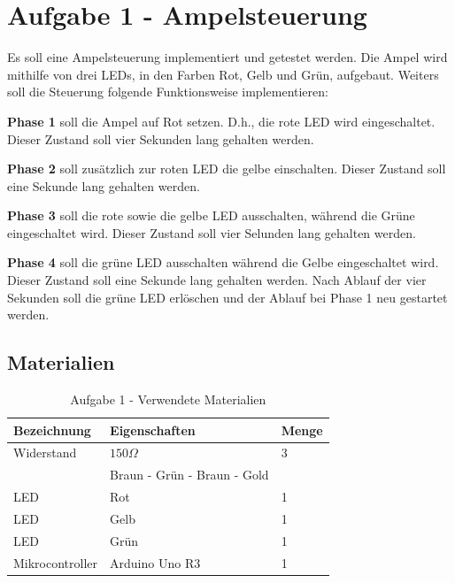 \section{Aufgabe 1 - Ampelsteuerung}
\label{sec:aufgabe-1}

Es soll eine Ampelsteuerung implementiert und getestet werden.
Die Ampel wird mithilfe von drei LEDs, in den Farben Rot, Gelb und Grün, aufgebaut.
Weiters soll die Steuerung folgende Funktionsweise implementieren:

\textbf{Phase 1} soll die Ampel auf Rot setzen.
D.h., die rote LED wird eingeschaltet.
Dieser Zustand soll vier Sekunden lang gehalten werden.

\textbf{Phase 2} soll zusätzlich zur roten LED die gelbe einschalten.
Dieser Zustand soll eine Sekunde lang gehalten werden.

\textbf{Phase 3} soll die rote sowie die gelbe LED ausschalten, während die Grüne eingeschaltet wird.
Dieser Zustand soll vier Selunden lang gehalten werden.

\textbf{Phase 4} soll die grüne LED ausschalten während die Gelbe eingeschaltet wird.
Dieser Zustand soll eine Sekunde lang gehalten werden.
Nach Ablauf der vier Sekunden soll die grüne LED erlöschen und der Ablauf bei Phase 1 neu gestartet werden.

\subsection{Materialien}
\label{subsec:A1-materialien}

\begin{table}[h]
    \centering
    \caption{Aufgabe 1 - Verwendete Materialien}
    \label{tab:a1-materialien}
    \begin{tabular}{| l | l | l |}
        \hline
        Bezeichnung & Eigenschaften & Menge \\
        \hline
        Widerstand  & $150\Omega$   & 3     \\
        & Braun - Grün - Braun - Gold & \\
        LED & Rot & 1 \\
        LED & Gelb & 1 \\
        LED & Grün & 1 \\
        Mikrocontroller & Arduino Uno R3 & 1 \\
        \hline
    \end{tabular}
\end{table}

\newpage

